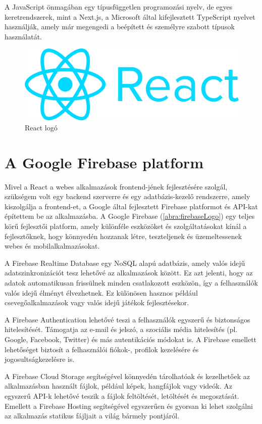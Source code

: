 A JavaScript önmagában egy típusfüggetlen programozási nyelv, de egyes keretrendszerek, mint a Next.js, a Microsoft által kifejlesztett TypeScript nyelvet használják, amely már megengedi a beépített és személyre szabott típusok használatát.

\begin{figure}[!h]
	\centering
	\includegraphics[scale=0.02]{images/reactLogo}
	\caption{React logó}
	\label{abra:reactLogo}
\end{figure}

\section {A Google Firebase platform}

Mivel a React a webes alkalmazások frontend-jének fejlesztésére szolgál, szükségem volt egy backend szerverre és egy adatbázis-kezelő rendszerre, amely kiszolgálja a frontend-et, a Google által fejlesztett Firebase platformot és API-kat építettem be az alkalmazásba.
A Google Firebase (\ref{abra:firebaseLogo}) egy teljes körű fejlesztői platform, amely különféle eszközöket és szolgáltatásokat kínál a fejlesztőknek, hogy könnyedén hozzanak létre, teszteljenek és üzemeltessenek webes és mobilalkalmazásokat.

A Firebase Realtime Database egy NoSQL alapú adatbázis, amely valós idejű adatszinkronizációt tesz lehetővé az alkalmazások között. Ez azt jelenti, hogy az adatok automatikusan frissülnek minden csatlakozott eszközön, így a felhasználók valós idejű élményt élvezhetnek. Ez különösen hasznos például csevegőalkalmazások vagy valós idejű játékok fejlesztésekor. 

A Firebase Authentication lehetővé teszi a felhasználók egyszerű és biztonságos hitelesítését. Támogatja az e-mail és jelszó, a szociális média hitelesítés (pl. Google, Facebook, Twitter) és más autentikációs módokat is. A Firebase emellett lehetőséget biztosít a felhasználói fiókok-, profilok kezelésére és jogosultságkezelésre is. 

\pagebreak
A Firebase Cloud Storage segítségével könnyedén tárolhatóak és kezelhetőek az alkalmazásban használt fájlok, például képek, hangfájlok vagy videók. Az egyszerű API-k lehetővé teszik a fájlok feltöltését, letöltését és megosztását. Emellett a Firebase Hosting segítségével egyszerűen és gyorsan ki lehet szolgálni az alkalmazás statikus fájljait a világ bármely pontjáról.

